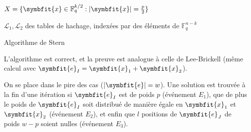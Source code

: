 \documentclass[a4paper,11pt,headings=small,footinclude=false]{scrartcl}
\theoremstyle{definition}
\theoremstyle{remark}
\begin{document}
\begin{algorithm}[H]
    \renewcommand{\algorithmcfname}{Algorithme}%
    \SetAlgoLined
    $X=\{ \symbfit{x}\in\mathbb{F}_q^{k/2} :|\symbfit{x}| =\frac{p}{2} \}$
    
    $\mathcal{L}_1, \mathcal{L}_2$ des tables de hachage, indexées par des éléments de $\mathbb{F}_q^{n-k}$
    
\caption{Algorithme de Stern}
\end{algorithm}

L'algorithme est correct, et la preuve est analogue à celle de Lee-Brickell (même calcul avec $\symbfit{e}_I=\symbfit{x}_1+\symbfit{x}_2$).

On se place dans le pire des cas ($|\symbfit{e}|=w$).
Une solution est trouvée à la fin d'une itération si $\symbfit{e}_I$ est de poids $p$ (événement $E_1$), que de plus le poids de $\symbfit{e}_I$ soit distribué de manière égale en $\symbfit{x}_1$ et $\symbfit{x}_2$ (événement $E_2$), et enfin que $l$ positions de $\symbfit{e}_J$ de poids $w-p$ soient nulles (événement $E_3$).
\end{document}
